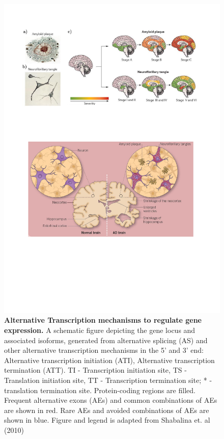 \begin{figure}[!h]
	\centering
	\includegraphics[page=14,trim={0 15cm 2cm 2cm},clip, scale = 0.7]{Figures/Introduction_Figures.pdf}
	\captionsetup{width=0.95\textwidth,singlelinecheck=off}
	\caption[Alternative transcription coupled with Alternative Splicing Mechanisms]%
	{\textbf{Alternative Transcription mechanisms to regulate gene expression.} A schematic figure depicting the gene locus and associated isoforms, generated from alternative splicing (AS) and other alternative transcription mechanisms in the 5' and 3' end: Alternative transcription initiation (ATI), Alternative transcription termination (ATT). \newline
	TI - Transcription initiation site, TS - Translation initiation site, TT - Transcription termination site; * - translation termination site. Protein-coding regions are filled. Frequent alternative exons (AEs) and common combinations of AEs are shown in red. Rare AEs and avoided combinations of AEs are shown in blue. Figure and legend is adapted from Shabalina et. al (2010)\cite{Shabalina2010}
	}
	\label{fig:AS_others}
\end{figure}

